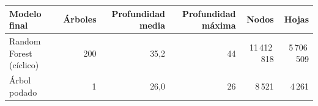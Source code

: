 \begin{tabular}{lrrrrr}
\toprule
Modelo final & Árboles & Profundidad media & Profundidad máxima & Nodos & Hojas \\
\midrule
Random Forest (cíclico) & 200 & 35{,}2 & 44 & 11\,412\,818 & 5\,706\,509 \\
Árbol podado & 1 & 26{,}0 & 26 & 8\,521 & 4\,261 \\
\bottomrule
\end{tabular}